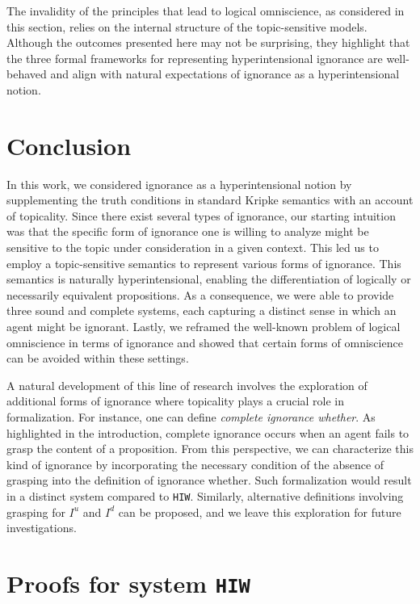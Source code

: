 \documentclass{article}
\begin{document}
The invalidity of the principles that lead to logical omniscience, as considered in this section, relies on the internal structure of the topic-sensitive models. Although the outcomes presented here may not be surprising, they highlight that the three formal frameworks for representing hyperintensional ignorance are well-behaved and align with natural expectations of ignorance as a hyperintensional notion.

\section{Conclusion}
\label{Conclusion}

In this work, we considered ignorance as a hyperintensional notion by supplementing the truth conditions in standard Kripke semantics with an account of topicality. Since there exist several types of ignorance, our starting intuition was that the specific form of ignorance one is willing to analyze might be sensitive to the topic under consideration in a given context. This led us to employ a topic-sensitive semantics to represent various forms of ignorance. This semantics is naturally hyperintensional, enabling the differentiation of logically or necessarily equivalent propositions. As a consequence, we were able to provide three sound and complete systems, each capturing a distinct sense in which an agent might be ignorant. Lastly, we reframed the well-known problem of logical omniscience in terms of ignorance and showed that certain forms of omniscience can be avoided within these settings.




A natural development of this line of research involves the exploration of additional forms of ignorance where topicality plays a crucial role in formalization. For instance, one can define \textit{complete ignorance whether}. As highlighted in the introduction, complete ignorance occurs when an agent fails to grasp the content of a proposition. From this perspective, we can characterize this kind of ignorance by  incorporating the necessary condition of the absence of grasping into the definition of ignorance whether. Such formalization would result in a distinct system compared to \texttt{HIW}. Similarly, alternative definitions involving grasping for $I^{u}$ and $I^{d}$ can be proposed, and we leave this exploration for future investigations.


\appendix

\section{Proofs for system \texttt{HIW}}
\end{document}
